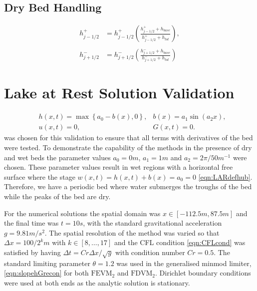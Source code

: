 \documentclass[times]{elsarticle}
\begin{document}
\subsection{Dry Bed Handling}

\begin{subequations}
	\begin{align}
	h^+_{j-1/2} & = h^+_{j-1/2} \left(\frac{ h^+_{j-1/2}  + h_{base}}{h^+_{j-1/2} + h_{tol}}\right) , \\ \nonumber\\
	h^-_{j+1/2} & = h^-_{j+1/2} \left(\frac{ h^-_{j+1/2}  + h_{base}}{h^-_{j+1/2} + h_{tol}}\right)
	\end{align} 
	\label{eqn:hdrytransform}
\end{subequations}

\section{Lake at Rest Solution Validation}

\begin{subequations}
	\begin{align}
	&h(x,t) = \max\left\lbrace a_0 - b(x), 0 \right\rbrace, & b(x) = a_1 \sin\left(a_2 x\right), \\
	&u(x,t) = 0 , 	&G(x,t) = 0 .
	\end{align}
	\label{eqn:LARdefhub}
\end{subequations}
was chosen for this validation to ensure that all terms with derivatives of the bed were tested. To demonstrate the capability of the methods in the presence of dry and wet beds the parameter values $a_0 = 0m$, $a_1 = 1m$ and $a_2 = 2 \pi / 50 m^{-1} $ were chosen. These parameter values result in wet regions with a horizontal free surface where the stage $w(x,t)= h(x,t) + b(x) =a_0= 0$ \eqref{eqn:LARdefhub}. Therefore, we have a periodic bed where water submerges the troughs of the bed while the peaks of the bed are dry. 

For the numerical solutions the spatial domain was $x \in \left[-112.5 m,87.5 m\right]$ and the final time was $t=10s$, with the standard gravitational acceleration $g= 9.81 m/s^2$. The spatial resolution of the method was varied so that $\Delta x = 100 / 2^k m$ with $k \in \left[8, \dots ,17\right]$ and the CFL condition \eqref{eqn:CFLcond} was satisfied by having $\Delta t = Cr \Delta x / \sqrt{g}$ with condition number $Cr = 0.5$. The standard limiting parameter $\theta = 1.2$ was used in the generalised minmod limiter, \eqref{eqn:slopehGrecon} for both $\text{FEVM}_2$ and $\text{FDVM}_2$. Dirichlet boundary conditions were used at both ends as the analytic solution is stationary.
\end{document}
